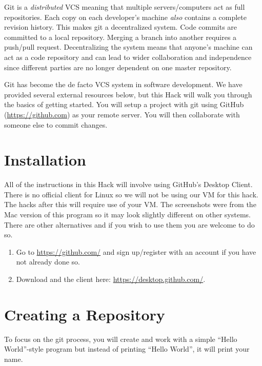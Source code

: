 \documentclass[12pt]{scrartcl}
\begin{document}
Git is a \emph{distributed} VCS meaning that multiple servers/computers 
act as full repositories.  Each copy on each developer's machine 
\emph{also} contains a complete revision history.  This makes git a 
decentralized system.  Code commits are committed to a local repository.  
Merging a branch into another requires a push/pull request.  
Decentralizing the system means that anyone's 
machine can act as a code repository and can lead to wider collaboration 
and independence since different parties are no longer dependent on 
one master repository.

Git has become the de facto VCS system in software development.  We have
provided several external resources below, but this Hack will walk you
through the basics of getting started.  You will setup a project with 
git using GitHub (\url{https://github.com}) as your remote server.  You
will then collaborate with someone else to commit changes.

\section{Installation}

All of the instructions in this Hack will involve using GitHub's 
Desktop Client. There is no official client for Linux so we will not be using our VM for this hack. The hacks after this will require use of your VM. The screenshots were from the Mac version of this
program so it may look slightly different on other systems.  There 
are other alternatives and if you wish to use them you are welcome 
to do so.

\begin{enumerate}
  \item Go to \url{https://github.com/} and sign up/register with
  an account if you have not already done so.
  \item Download and the client here: \url{https://desktop.github.com/}.
\end{enumerate}

\section{Creating a Repository}

To focus on the git process, you will create and work with a simple
``Hello World''-style program but instead of printing ``Hello World'', 
it will print your name. 
\end{document}
